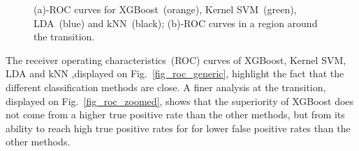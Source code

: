 \begin{figure}[htb]
	\hfill%
	\hfill%
	\hfill\null%
	\caption{(a)-ROC curves for XGBoost~(orange), Kernel SVM~(green), LDA~(blue) and kNN~(black); (b)-ROC curves in a region around the transition.}
	\label{fig_tree_feature}
\end{figure}

The receiver operating characteristics~(ROC) curves of XGBoost, Kernel SVM, LDA and kNN ,displayed on Fig.~\ref{fig_roc_generic}, highlight the fact that the different classification methods are close. A finer analysis at the transition, displayed on Fig.~\ref{fig_roc_zoomed}, shows that the superiority of XGBoost does not come from a higher true positive rate than the other methods, but from its ability to reach high true positive rates for for lower false positive rates than the other methods.  
